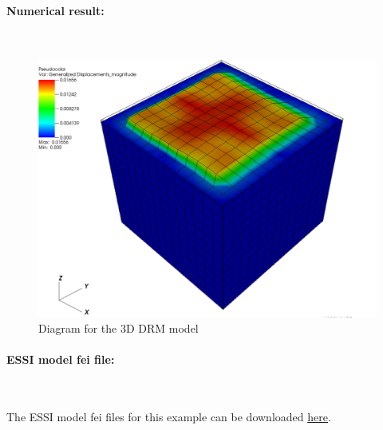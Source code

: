 \documentclass[fleqn,11pt]{article}
\begin{document}




\paragraph{Numerical result:} ~

\begin{figure}[H]
  \centering
  \includegraphics[width=15cm]{../Figure-files/3d_drm_result429.png}
  \caption{Diagram for the 3D DRM model}
  \label{fig Diagram for the 3D DRM model}
\end{figure}


\paragraph{ESSI model fei file: } ~



The ESSI model fei files for this example can be downloaded \href{https://github.com/yuan-energy/Real-ESSI-Examples/blob/master/model_fei_file/DRM_3D/DRM_3D.tgz?raw=true}{here}.
\end{document}
